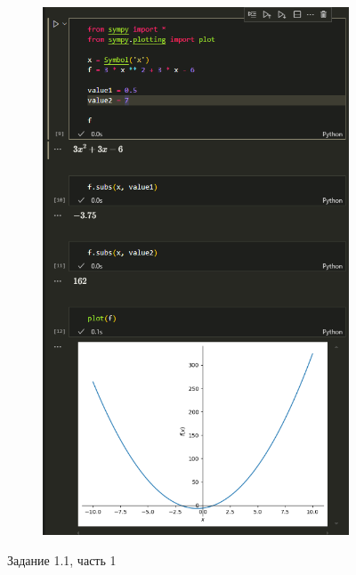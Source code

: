 \documentclass[14pt,a4paper]{extarticle}
\begin{document}
\begin{figure}[!ht]
\begin{subfigure}{.5\textwidth}
        \includegraphics[width=0.9\linewidth]{figures/1.1 (2).png}
        \label{fig:1.1(2)}
    \end{subfigure}
    \caption{Задание 1.1, часть 1}
    \label{fig:1.1-part1}
\end{figure}
\end{document}
